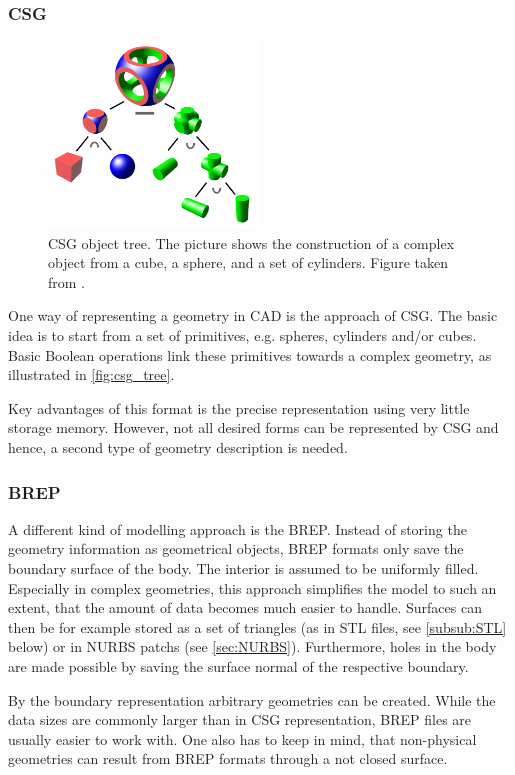 \subsubsection{\Acl{CSG}}
\begin{figure}
\centering
\includegraphics[width=0.5\textwidth]{Pictures/Csg_tree.png}
\caption{\ac{CSG} object tree. The picture shows the construction of a complex object from a cube, a sphere, and a set of cylinders. Figure taken from \cite{WikipediaCSG}.}
\label{fig:csg_tree}
\end{figure}
One way of representing a geometry in \ac{CAD} is the approach of \ac{CSG}. The basic idea is to start from a set of primitives, e.g. spheres, cylinders and/or cubes. Basic Boolean operations link these primitives towards a complex geometry, as illustrated in \autoref{fig:csg_tree}.

Key advantages of this format is the precise representation using very little storage memory. However, not all desired forms can be represented by \ac{CSG} and hence, a second type of geometry description is needed. 
\subsubsection{\Acl{BREP}}
A different kind of modelling approach is the \ac{BREP}. Instead of storing the geometry information as geometrical objects, \ac{BREP} formats only save the boundary surface of the body. The interior is assumed to be uniformly filled. Especially in complex geometries, this approach simplifies the model to such an extent, that the amount of data becomes much easier to handle. Surfaces can then be for example stored as a set of triangles (as in \ac{STL} files, see \autoref{subsub:STL} below) or in \ac{NURBS} \acsp{patch} (see \autoref{sec:NURBS}).
Furthermore, holes in the body are made possible by saving the surface normal of the respective boundary. 

By the boundary representation arbitrary geometries can be created. While the data sizes are commonly larger than in \ac{CSG} representation, \ac{BREP} files are usually easier to work with. One also has to keep in mind, that non-physical geometries can result from \ac{BREP} formats through a not closed surface.
